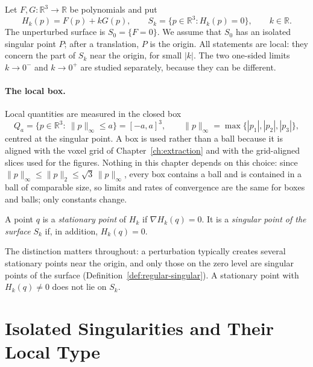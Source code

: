Let $F,G:\mathbb{R}^3\to\mathbb{R}$ be polynomials and put
\begin{equation}
\label{eq:family}
H_k(p)=F(p)+kG(p),\qquad S_k=\{p\in\mathbb{R}^3: H_k(p)=0\},\qquad k\in\mathbb{R}.
\end{equation}
The unperturbed surface is $S_0=\{F=0\}$. We assume that $S_0$ has an
isolated singular point $P$; after a translation, $P$ is the origin. All
statements are local: they concern the part of $S_k$ near the origin, for
small $|k|$. The two one-sided limits $k\to0^-$ and $k\to0^+$ are studied
separately, because they can be different.

\paragraph{The local box.}
Local quantities are measured in the closed box
\begin{equation}
\label{eq:box}
Q_a=\{p\in\mathbb{R}^3:\ \|p\|_\infty\le a\}=[-a,a]^3,\qquad
\|p\|_\infty=\max\{|p_1|,|p_2|,|p_3|\},
\end{equation}
centred at the singular point. A box is used rather than a ball because it is
aligned with the voxel grid of Chapter~\ref{ch:extraction} and with the grid-aligned slices
used for the figures. Nothing in this chapter depends on this choice: since
$\|p\|_\infty\le\|p\|_2\le\sqrt3\,\|p\|_\infty$, every box contains a ball
and is contained in a ball of comparable size, so limits and rates of
convergence are the same for boxes and balls; only constants change.

\begin{definition}
\label{def:singular-perturbed}
A point $q$ is a \emph{stationary point} of $H_k$ if $\nabla H_k(q)=0$. It is
a \emph{singular point of the surface} $S_k$ if, in addition, $H_k(q)=0$.
\end{definition}

The distinction matters throughout: a perturbation typically creates several
stationary points near the origin, and only those on the zero level are
singular points of the surface (Definition~\ref{def:regular-singular}). A
stationary point with $H_k(q)\neq0$ does not lie on $S_k$.

\section{Isolated Singularities and Their Local Type}
\label{sec:local-type}

